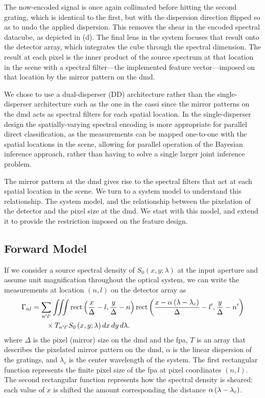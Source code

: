 The now-encoded signal is once again collimated before hitting the second grating, which is identical to the first, but with the dispersion direction flipped so as to undo the applied dispersion. This removes the shear in the encoded spectral datacube, as depicted in (d). The final lens in the system focuses that result onto the detector array, which integrates the cube through the spectral dimension. The result at each pixel is the inner product of the source spectrum at that location in the scene with a spectral filter---the implemented feature vector---imposed on that location by the mirror pattern on the \gls{dmd}.

We chose to use a dual-disperser (DD) architecture rather than the single-disperser architecture such as the one in the \gls{cassi} since the mirror patterns on the \gls{dmd} acts as spectral filters for each spatial location. In the single-disperser design the spatially-varying spectral encoding is more appropriate for parallel direct classification, as the measurements can be mapped one-to-one with the spatial locations in the scene, allowing for parallel operation of the Bayesian inference approach, rather than having to solve a single larger joint inference problem.

The mirror pattern at the \gls{dmd} gives rise to the spectral filters that act at each spatial location in the scene. We turn to a system model to understand this relationship.
The system model, and the relationship between the pixelation of the detector and the pixel size at the \gls{dmd}. We start with this model, and extend it to provide the restriction imposed on the feature design.

\subsection{Forward Model}

If we consider a source spectral density of $S_0 \left(x, y;\lambda \right)$ at the input aperture and assume unit magnification throughout the optical system, we can write the measurements at location $(n,l)$ on the detector array as
%
\begin{align} \label{eq:PixelizedDetectIntensity}
	\Gamma_{nl} &= \sum_{n^\prime l^\prime} \iiint \mbox{rect} \left( \frac{x}{\Delta} - l, \frac{y}{\Delta} - n \right) \mbox{rect} \left( \frac{x-\alpha \left(\lambda - \lambda_c\right)}{\Delta} - l^\prime , \frac{y}{\Delta} - n^\prime \right) \notag \\
 	&\qquad \times T_{n^\prime l^\prime} S_0 \left( x, y; \lambda \right) dx \, dy \, d\lambda.
\end{align}
%
where $\Delta$ is the pixel (mirror) size on the \gls{dmd} and the \gls{fpa}, $T$ is an array that describes the pixelated  mirror pattern on the \gls{dmd},  $\alpha$ is the linear dispersion of the gratings, and $\lambda_c$ is the center wavelength of the system. The first rectangular function represents the finite pixel size of the \gls{fpa} at pixel coordinates $(n,l)$. The second rectangular function represents how the spectral density is sheared: each  value of $x$ is shifted the amount corresponding the distance $\alpha \left( \lambda - \lambda_c \right)$. 



